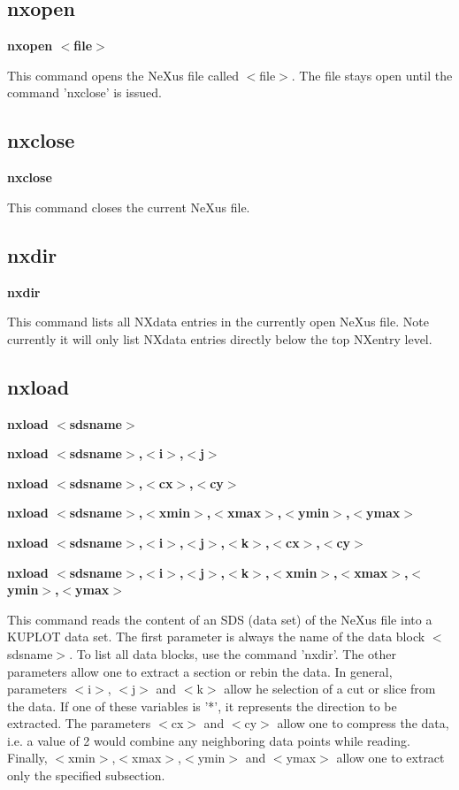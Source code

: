 \subsection*{nxopen}
{\bf nxopen $ <$file$> $ \par }
\par
\vspace{3pt}
This command opens the NeXus file called $ <$file$> $. The file stays 
open until the command 'nxclose' is issued. 
\subsection*{nxclose}
{\bf nxclose \par }
\par
\vspace{3pt}
This command closes the current NeXus file. 
\subsection*{nxdir}
{\bf nxdir \par }
\par
\vspace{3pt}
This command lists all NXdata entries in the currently open NeXus 
file. Note currently it will only list NXdata entries directly 
below the top NXentry level. 
\subsection*{nxload}
{\bf nxload $ <$sdsname$> $ \par }
{\bf nxload $ <$sdsname$> $,$ <$i$> $,$ <$j$> $ \par }
{\bf nxload $ <$sdsname$> $,$ <$cx$> $,$ <$cy$> $ \par }
{\bf nxload $ <$sdsname$> $,$ <$xmin$> $,$ <$xmax$> $,$ <$ymin$> $,$ <$ymax$> $ \par }
{\bf nxload $ <$sdsname$> $,$ <$i$> $,$ <$j$> $,$ <$k$> $,$ <$cx$> $,$ <$cy$> $ \par }
{\bf nxload $ <$sdsname$> $,$ <$i$> $,$ <$j$> $,$ <$k$> $,$ <$xmin$> $,$ <$xmax$> $,$ <$ymin$> $,$ <$ymax$> $ \par }
\par
\vspace{3pt}
This command reads the content of an SDS (data set) of the NeXus 
file into a KUPLOT data set. The first parameter is always the 
name of the data block $ <$sdsname$> $. To list all data blocks, use the 
command 'nxdir'. The other parameters allow one to extract a 
section or rebin the data. In general, parameters $ <$i$> $, $ <$j$> $ and 
$ <$k$> $ allow he selection of a cut or slice from the data. If one of 
these variables is '*', it represents the direction to be extracted. 
The parameters $ <$cx$> $ and $ <$cy$> $ allow one to compress the data, i.e. 
a value of 2 would combine any neighboring data points while 
reading. Finally, $ <$xmin$> $,$ <$xmax$> $,$ <$ymin$> $ and $ <$ymax$> $ allow one to 
extract only the specified subsection. 
